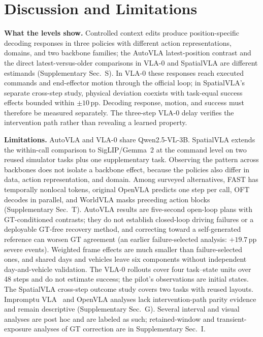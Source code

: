 \section{Discussion and Limitations}
\label{sec:limits}
\textbf{What the levels show.} Controlled context edits produce position-specific decoding responses in three policies with different action representations, domains, and two backbone families; the AutoVLA latest-position contrast and the direct latest-versus-older comparisons in VLA-0 and SpatialVLA are different estimands (Supplementary Sec.~S). In VLA-0 these responses reach executed commands and end-effector motion through the official loop; in SpatialVLA's separate cross-step study, physical deviation coexists with task-equal success effects bounded within $\pm10$\,pp. Decoding response, motion, and success must therefore be measured separately. The three-step VLA-0 delay verifies the intervention path rather than revealing a learned property.

\textbf{Limitations.} AutoVLA and VLA-0 share Qwen2.5-VL-3B. SpatialVLA extends the within-call comparison to SigLIP/Gemma~2 at the command level on two reused simulator tasks plus one supplementary task. Observing the pattern across backbones does not isolate a backbone effect, because the policies also differ in data, action representation, and domain. Among surveyed alternatives, FAST has temporally nonlocal tokens, original OpenVLA predicts one step per call, OFT decodes in parallel, and WorldVLA masks preceding action blocks (Supplementary Sec.~T). AutoVLA results are five-second open-loop plans with GT-conditioned contrasts; they do not establish closed-loop driving failures or a deployable GT-free recovery method, and correcting toward a self-generated reference can worsen GT agreement (an earlier failure-selected analysis: $+19.7$\,pp severe events). Weighted frame effects are much smaller than failure-selected ones, and shared days and vehicles leave six components without independent day-and-vehicle validation. The VLA-0 rollouts cover four task--state units over 48 steps and do not estimate success; the pilot's observations are initial states. The SpatialVLA cross-step outcome study covers two tasks with reused layouts. Impromptu VLA~\cite{chi2025impromptu} and OpenVLA analyses lack intervention-path parity evidence and remain descriptive (Supplementary Sec.~G). Several interval and visual analyses are post hoc and are labeled as such; retained-window and transient-exposure analyses of GT correction are in Supplementary Sec.~I.

